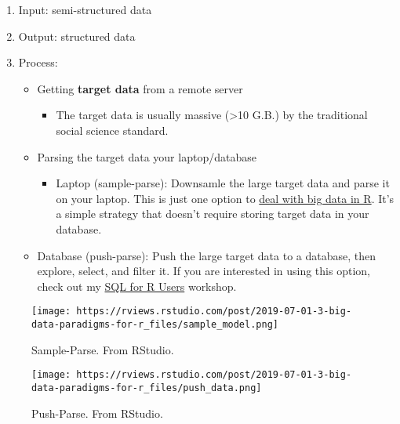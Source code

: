 \documentclass[
]{book}
\providecommand{\tightlist}{%
  \setlength{\itemsep}{0pt}\setlength{\parskip}{0pt}}
\begin{document}
\begin{enumerate}
\def\labelenumi{\arabic{enumi}.}
\item
  Input: semi-structured data
\item
  Output: structured data
\item
  Process:

  \begin{itemize}
  \item
    Getting \textbf{target data} from a remote server

    \begin{itemize}
    \tightlist
    \item
      The target data is usually massive (\textgreater10 G.B.) by the traditional social science standard.
    \end{itemize}
  \item
    Parsing the target data your laptop/database

    \begin{itemize}
    \tightlist
    \item
      Laptop (sample-parse): Downsamle the large target data and parse it on your laptop. This is just one option to \href{https://rviews.rstudio.com/2019/07/17/3-big-data-strategies-for-r/}{deal with big data in R}. It's a simple strategy that doesn't require storing target data in your database.
    \end{itemize}
  \item
    Database (push-parse): Push the large target data to a database, then explore, select, and filter it. If you are interested in using this option, check out my \href{https://github.com/dlab-berkeley/sql-for-r-users}{SQL for R Users} workshop.
  \end{itemize}
\end{enumerate}

\begin{figure}
\centering
\texttt{[image: https://rviews.rstudio.com/post/2019-07-01-3-big-data-paradigms-for-r\_files/sample\_model.png]}
\caption{Sample-Parse. From RStudio.}
\end{figure}

\begin{figure}
\centering
\texttt{[image: https://rviews.rstudio.com/post/2019-07-01-3-big-data-paradigms-for-r\_files/push\_data.png]}
\caption{Push-Parse. From RStudio.}
\end{figure}
\end{document}
